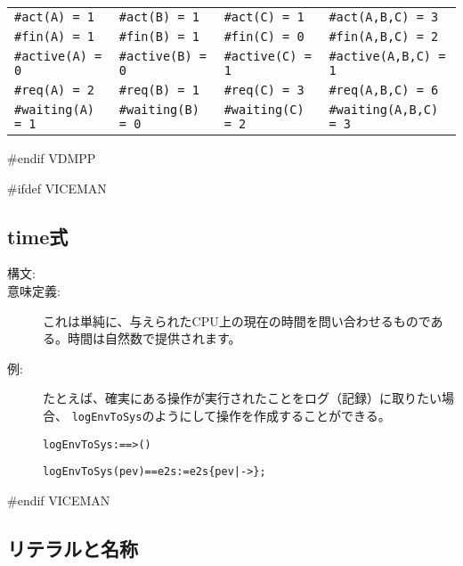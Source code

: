 \documentclass[\pformat,12pt]{jarticle}
\begin{document}
\begin{center}\small
\begin{tabular}{llll}
\texttt{\#act(A) = 1} & \texttt{\#act(B) = 1} & \texttt{\#act(C) = 1}
& \texttt{\#act(A,B,C) = 3}\\
\texttt{\#fin(A) = 1} & \texttt{\#fin(B) = 1} & \texttt{\#fin(C) = 0}
& \texttt{\#fin(A,B,C) = 2}\\
\texttt{\#active(A) = 0} & \texttt{\#active(B) = 0} & 
\texttt{\#active(C) = 1} & \texttt{\#active(A,B,C) = 1}\\
\texttt{\#req(A) = 2} & \texttt{\#req(B) = 1} & \texttt{\#req(C) = 3}
& \texttt{\#req(A,B,C) = 6}\\
\texttt{\#waiting(A) = 1} & \texttt{\#waiting(B) = 0} & 
\texttt{\#waiting(C) = 2} & \texttt{\#waiting(A,B,C) = 3}\\
\end{tabular}
\end{center}


#endif VDMPP

#ifdef VICEMAN
\subsection{time式}\label{sec:time}

\begin{description}
\item[構文:] 

\item[意味定義:] これは単純に、与えられたCPU上の現在の時間を問い合わせるものである。時間は自然数で提供されます。
\item[例:] たとえば、確実にある操作が実行されたことをログ（記録）に取りたい場合、 \texttt{logEnvToSys}のようにして操作を作成することができる。
\begin{alltt}

   logEnvToSys:  ==> ()

  logEnvToSys (pev) == e2s := e2s  \{pev |-> \};

\end{alltt}
\end{description}

#endif VICEMAN

\subsection{リテラルと名称}
\end{document}
